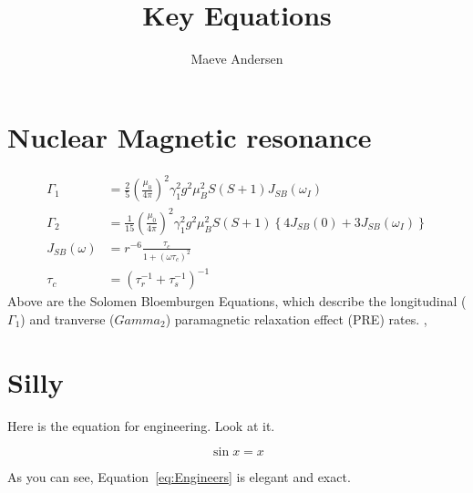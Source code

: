\documentclass{article}
\title{Key Equations}
\author{Maeve Andersen}
\newcommand{\refeq}[1]{Equation~\ref{#1}}
\begin{document}
\maketitle

\section{Nuclear Magnetic resonance}
\begin{align}
\Gamma_1 &= \frac{2}{5} \left( \frac{\mu_0}{4\pi} \right)^2 \gamma_1^2 g^2 \mu_B^2 S(S+1)J_{SB}(\omega_I)\\
\Gamma_2 &= \frac{1}{15} \left( \frac{\mu_0}{4\pi} \right)^2 \gamma_1^2 g^2 \mu_B^2 S(S+1) \left\{ 4 J_{SB}(0) + 3J_{SB}(\omega_I) \right\}\\
J_{SB}(\omega) &= r^{-6} \frac{\tau_c}{1+ \left( \omega \tau_c \right)^2}\\
\tau_c &= \left (\tau_r^{-1} + \tau_s^{-1}\right)^{-1}
\end{align}
Above are the Solomen Bloemburgen Equations, which describe the longitudinal ($\Gamma_1$) and tranverse ($Gamma_2$) paramagnetic relaxation effect (PRE) rates. \cite{bloembergenProtonRelaxationTimes1961},\cite{solomonRelaxationProcessesSystem1955}
\section{Silly}
Here is the equation for engineering. Look at it.

\begin{equation}\label{eq:Engineers}
    \sin x = x
\end{equation}

As you can see, \refeq{eq:Engineers} is elegant and exact. 



\end{document}
